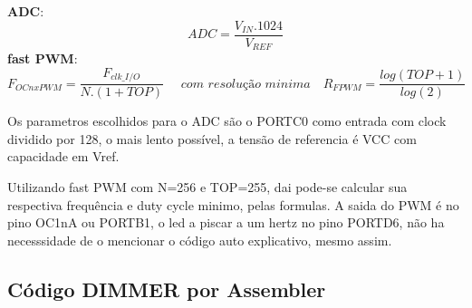 \documentclass[titlepage, a4paper, 10pt, reqno, openany]{report}
\begin{document}
{\bf ADC}:
\[ \boxed{ADC=\frac{V_{IN}.1024}{V_{REF}}} \]
{\bf fast PWM}:
\[ \boxed{F_{OCnxPWM}=\frac{F_{clk\_I/O}}{N.(1+{TOP})}} \quad \textit{ com resolu\c{c}\~{a}o minima} \quad \boxed{R_{FPWM}=\frac{log(TOP+1)}{log(2)}} \] \par
Os parametros escolhidos para o ADC s\~{a}o o PORTC0 como entrada com clock dividido por 128, o mais lento poss\'{i}vel, a tens\~{a}o de referencia \'{e} VCC com capacidade em Vref. \par
Utilizando fast PWM com N=256 e TOP=255, dai pode-se calcular sua respectiva frequ\^{e}ncia e duty cycle minimo, pelas formulas.
A saida do PWM \'{e} no pino OC1nA ou PORTB1, o led a piscar a um hertz no pino PORTD6, n\~{a}o ha necesssidade de o mencionar o c\'{o}digo auto explicativo, mesmo assim.

	\subsection{C\'{o}digo DIMMER por Assembler}
\end{document}
